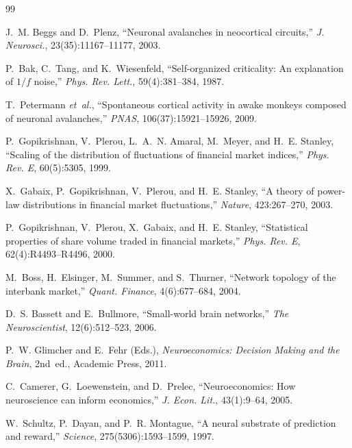 \documentclass[12pt,twocolumn]{ltjsarticle}
\begin{document}
\begin{thebibliography}{99}

J.~M. Beggs and D.~Plenz,
``Neuronal avalanches in neocortical circuits,''
\textit{J. Neurosci.}, 23(35):11167--11177, 2003.

P.~Bak, C.~Tang, and K.~Wiesenfeld,
``Self-organized criticality: An explanation of $1/f$ noise,''
\textit{Phys. Rev. Lett.}, 59(4):381--384, 1987.

T.~Petermann \textit{et~al.},
``Spontaneous cortical activity in awake monkeys composed of
neuronal avalanches,''
\textit{PNAS}, 106(37):15921--15926, 2009.

P.~Gopikrishnan, V.~Plerou, L.~A.~N. Amaral, M.~Meyer, and H.~E. Stanley,
``Scaling of the distribution of fluctuations of financial market indices,''
\textit{Phys. Rev. E}, 60(5):5305, 1999.

X.~Gabaix, P.~Gopikrishnan, V.~Plerou, and H.~E. Stanley,
``A theory of power-law distributions in financial market fluctuations,''
\textit{Nature}, 423:267--270, 2003.

P.~Gopikrishnan, V.~Plerou, X.~Gabaix, and H.~E. Stanley,
``Statistical properties of share volume traded in financial markets,''
\textit{Phys. Rev. E}, 62(4):R4493--R4496, 2000.

M.~Boss, H.~Elsinger, M.~Summer, and S.~Thurner,
``Network topology of the interbank market,''
\textit{Quant. Finance}, 4(6):677--684, 2004.

D.~S. Bassett and E.~Bullmore,
``Small-world brain networks,''
\textit{The Neuroscientist}, 12(6):512--523, 2006.

P.~W. Glimcher and E.~Fehr (Eds.),
\textit{Neuroeconomics: Decision Making and the Brain},
2nd~ed., Academic Press, 2011.

C.~Camerer, G.~Loewenstein, and D.~Prelec,
``Neuroeconomics: How neuroscience can inform economics,''
\textit{J. Econ. Lit.}, 43(1):9--64, 2005.

W.~Schultz, P.~Dayan, and P.~R. Montague,
``A neural substrate of prediction and reward,''
\textit{Science}, 275(5306):1593--1599, 1997.


\end{thebibliography}
\end{document}
